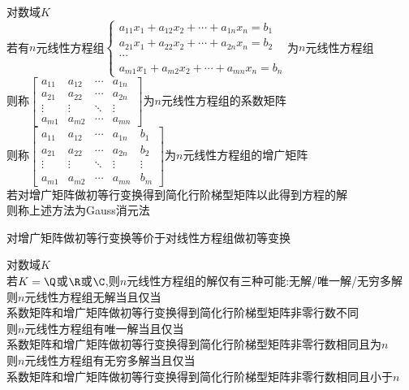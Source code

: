 \begin{dingyi}
对数域$K$\\
若有$n$元线性方程组$\begin{cases}a_{11}x_1+a_{12}x_2+\cdots+a_{1n}x_n=b_1\\ a_{21}x_1+a_{22}x_2+\cdots+a_{2n}x_n=b_2\\ \cdots\\ a_{m1}x_1+a_{m2}x_2+\cdots+a_{mn}x_n=b_n\end{cases}$为$n$元线性方程组\\
则称$\begin{bmatrix}a_{11} & a_{12} & \cdots & a_{1n} \\ a_{21} & a_{22} & \cdots & a_{2n} \\ \vdots & \vdots & \ddots & \vdots \\ a_{m1} & a_{m2} & \cdots & a_{mn}\end{bmatrix}$为$n$元线性方程组的系数矩阵\\
则称$\begin{bmatrix}a_{11} & a_{12} & \cdots & a_{1n} & b_1\\ a_{21} & a_{22} & \cdots & a_{2n} & b_2\\ \vdots & \vdots & \ddots & \vdots & \vdots\\ a_{m1} & a_{m2} & \cdots & a_{mn} & b_m\end{bmatrix}$为$n$元线性方程组的增广矩阵\\
若对增广矩阵做初等行变换得到简化行阶梯型矩阵以此得到方程的解\\
则称上述方法为Gauss消元法
\end{dingyi}

\begin{zhu}
对增广矩阵做初等行变换等价于对线性方程组做初等变换
\end{zhu}

\begin{dingli}
对数域$K$\\
若$K=\Q$或$\R$或$\C$,则$n$元线性方程组的解仅有三种可能:无解/唯一解/无穷多解\\
则$n$元线性方程组无解当且仅当\\
系数矩阵和增广矩阵做初等行变换得到简化行阶梯型矩阵非零行数不同\\
则$n$元线性方程组有唯一解当且仅当\\
系数矩阵和增广矩阵做初等行变换得到简化行阶梯型矩阵非零行数相同且为$n$\\
则$n$元线性方程组有无穷多解当且仅当\\
系数矩阵和增广矩阵做初等行变换得到简化行阶梯型矩阵非零行数相同且小于$n$
\end{dingli}

